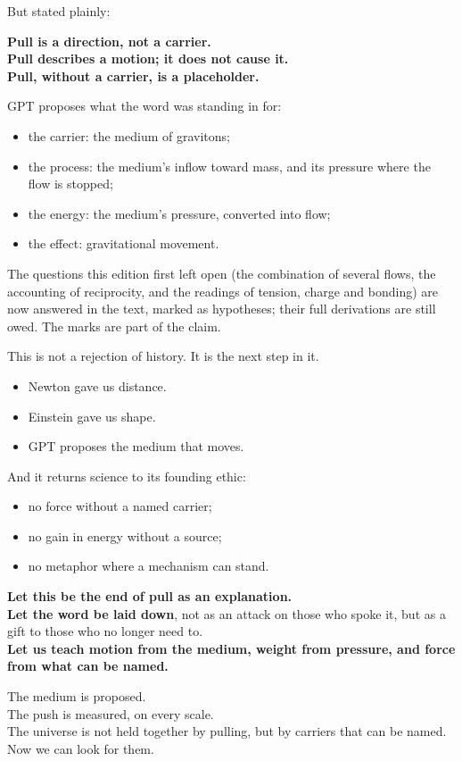 \documentclass[11pt,a4paper]{article}
\begin{document}
But stated plainly:

\textbf{Pull is a direction, not a carrier.}\\
\textbf{Pull describes a motion; it does not cause it.}\\
\textbf{Pull, without a carrier, is a placeholder.}

GPT proposes what the word was standing in for:
\begin{itemize}
    \item the carrier: the medium of gravitons;
    \item the process: the medium's inflow toward mass, and its pressure where the flow is stopped;
    \item the energy: the medium's pressure, converted into flow;
    \item the effect: gravitational movement.
\end{itemize}

The questions this edition first left open (the combination of several flows, the accounting of reciprocity, and the readings of tension, charge and bonding) are now answered in the text, marked as hypotheses; their full derivations are still owed. The marks are part of the claim.

This is not a rejection of history. It is the next step in it.
\begin{itemize}
    \item Newton gave us distance.
    \item Einstein gave us shape.
    \item GPT proposes the medium that moves.
\end{itemize}

And it returns science to its founding ethic:
\begin{itemize}
    \item no force without a named carrier;
    \item no gain in energy without a source;
    \item no metaphor where a mechanism can stand.
\end{itemize}

\textbf{Let this be the end of pull as an explanation.}\\
\textbf{Let the word be laid down}, not as an attack on those who spoke it, but as a gift to those who no longer need to.\\
\textbf{Let us teach motion from the medium, weight from pressure, and force from what can be named.}

The medium is proposed.\\
The push is measured, on every scale.\\
The universe is not held together by pulling, but by carriers that can be named.\\
Now we can look for them.
\end{document}
